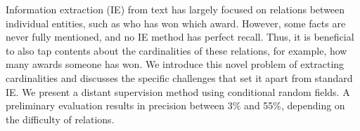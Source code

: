 Information extraction (IE) from text has largely focused on relations between individual entities, such as who has won which award. However, some facts are never fully mentioned, and no IE method has perfect recall. Thus, it is beneficial to also tap contents about the cardinalities of these relations, for example, how many awards someone has won. We introduce this novel problem of extracting cardinalities and discusses the specific challenges that set it apart from standard IE. We present a distant supervision method using conditional random fields. A preliminary evaluation results in precision between 3\% and 55\%, depending on the difficulty of relations.
